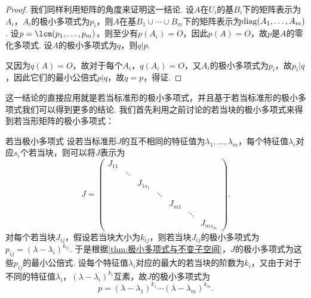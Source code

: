 \begin{proof}
    我们同样利用矩阵的角度来证明这一结论. 设$A$在$U_i$的基$B_i$下的矩阵表示为$A_i$，$A_i$的极小多项式为$p_i$，则$A$在基$B_1\cup\cdots\cup B_m$下的矩阵表示为$\operatorname{diag}(A_1,\ldots,A_m)$. 设$p=\lcm(p_1,\ldots,p_m)$，则至少有$p(A_i)=O$，因此$p(A)=O$，故$p$是$A$的零化多项式. 设$A$的极小多项式为$q$，则$q\vert p$.

    又因为$q(A)=O$，故对于每个$A_i$，$q(A_i)=O$，又$A_i$的极小多项式为$p_i$，故$p_i\vert q$，因此它们的最小公倍式$p\vert q$，故$q=p$，得证.
\end{proof}

这一结论的直接应用就是若当标准形的极小多项式，并且基于若当标准形的极小多项式我们可以得到更多的结论. 我们首先利用之前讨论的若当块的极小多项式来得到若当形矩阵的极小多项式：
\begin{example}{}{若当极小多项式}
    设若当标准形$J$的互不相同的特征值为$\lambda_1,\ldots,\lambda_m$，每个特征值$\lambda_i$对应$s_i$个若当块，则可以将$J$表示为
    \[J=\begin{pmatrix}
            J_{11} &        &          &        &        &        &          \\
                   & \ddots &          &        &        &        &          \\
                   &        & J_{1s_1} &        &        &        &          \\
                   &        &          & \ddots &        &        &          \\
                   &        &          &        & J_{m1} &        &          \\
                   &        &          &        &        & \ddots &          \\
                   &        &          &        &        &        & J_{ms_m}
        \end{pmatrix}.\]
    对每个若当块$J_{ij}$，假设若当块大小为$k_{ij}$，则若当块$J_{ij}$的极小多项式为$p_{ij}=(\lambda-\lambda_i)^{k_{ij}}$. 于是根据\autoref{thm:极小多项式与不变子空间}，$J$的极小多项式为这些$p_{ij}$的最小公倍式. 设每个特征值$\lambda_i$对应的最大的若当块的阶数为$k_i$，又由于对于不同的特征值$\lambda_i$，$(\lambda-\lambda_i)^{k_i}$互素，故$J$的极小多项式为
    \[p=(\lambda-\lambda_1)^{k_1}\cdots(\lambda-\lambda_m)^{k_m}.\]
\end{example}


